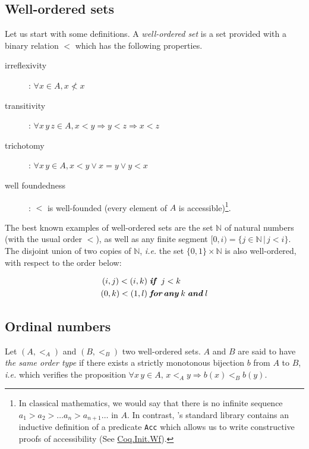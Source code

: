 \subsection{Well-ordered sets}
Let us start with some definitions.
A  \emph{well-ordered set} is a set provided with a binary relation $<$ which has the following properties.
\begin{description}
\item[irreflexivity] : $\forall x\in A, x\not< x$
\item[transitivity] : $\forall x\,y\,z\in A, x<y \Rightarrow y<z \Rightarrow x<z$
\item[trichotomy]: $\forall x\,y\in A, x<y \vee x = y \vee y < x$
\item[well foundedness]: $<$ is well-founded (every element of $A$ is accessible)\footnote{In classical mathematics, we would say that there is no infinite sequence $a_1>a_2> \dots a_n> a_{n+1}\dots$ in $A$. In contrast, \coq's standard library contains
an inductive definition of a predicate \texttt{Acc} which allows us to write 
constructive proofs of accessibility (See \href{https://coq.inria.fr/distrib/current/stdlib/Coq.Init.Wf.html}{Coq.Init.Wf}).}.
\end{description}

The best known examples of well-ordered sets are the set $\mathbb{N}$ of natural numbers (with the usual order $<$), as well as any finite segment $[0,i)=\{j\in\mathbb{N}\,|\,j<i\}$.
The disjoint union of two copies of $\mathbb{N}$, \emph{i.e.} the set $\{0,1\}\times\mathbb{N}$ is also well-ordered,
with respect to the order below:

\begin{align*}
(i,j) < (i,k) & \;\textit{\textbf{if} }\; j < k\\
(0,k) < (1,l) & \;\textit{\textbf{for\,any}}\;k \;\textit{\textbf{and}} \; l
\end{align*}

\subsection{Ordinal numbers}


Let $(A,<_A)$ and $(B,<_B)$ two well-ordered sets. $A$ and $B$ are said to have \emph{the same order type} if 
there exists a strictly monotonous bijection $b$ from $A$ to $B$, \emph{i.e.} which verifies the proposition
$\forall x\,y\in A,\, x <_A y \Rightarrow b(x) <_B  b(y)$.

